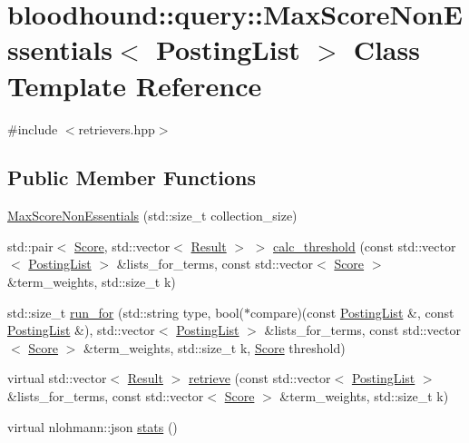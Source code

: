 \hypertarget{classbloodhound_1_1query_1_1MaxScoreNonEssentials}{}\section{bloodhound\+:\+:query\+:\+:Max\+Score\+Non\+Essentials$<$ Posting\+List $>$ Class Template Reference}
\label{classbloodhound_1_1query_1_1MaxScoreNonEssentials}


{\ttfamily \#include $<$retrievers.\+hpp$>$}

\subsection*{Public Member Functions}
\begin{DoxyCompactItemize}
\item 
\hyperlink{classbloodhound_1_1query_1_1MaxScoreNonEssentials_a4ca74b906a87120ffcad3bc6edcc148c}{Max\+Score\+Non\+Essentials} (std\+::size\+\_\+t collection\+\_\+size)
\item 
std\+::pair$<$ \hyperlink{structbloodhound_1_1Score}{Score}, std\+::vector$<$ \hyperlink{structbloodhound_1_1query_1_1Result}{Result} $>$ $>$ \hyperlink{classbloodhound_1_1query_1_1MaxScoreNonEssentials_a99253d51fb9d66cb6c4fd97e499ab1b0}{calc\+\_\+threshold} (const std\+::vector$<$ \hyperlink{classbloodhound_1_1PostingList}{Posting\+List} $>$ \&lists\+\_\+for\+\_\+terms, const std\+::vector$<$ \hyperlink{structbloodhound_1_1Score}{Score} $>$ \&term\+\_\+weights, std\+::size\+\_\+t k)
\item 
std\+::size\+\_\+t \hyperlink{classbloodhound_1_1query_1_1MaxScoreNonEssentials_a8ae12fdfe4bedefa5811bd89ffcf5597}{run\+\_\+for} (std\+::string type, bool($\ast$compare)(const \hyperlink{classbloodhound_1_1PostingList}{Posting\+List} \&, const \hyperlink{classbloodhound_1_1PostingList}{Posting\+List} \&), std\+::vector$<$ \hyperlink{classbloodhound_1_1PostingList}{Posting\+List} $>$ \&lists\+\_\+for\+\_\+terms, const std\+::vector$<$ \hyperlink{structbloodhound_1_1Score}{Score} $>$ \&term\+\_\+weights, std\+::size\+\_\+t k, \hyperlink{structbloodhound_1_1Score}{Score} threshold)
\item 
virtual std\+::vector$<$ \hyperlink{structbloodhound_1_1query_1_1Result}{Result} $>$ \hyperlink{classbloodhound_1_1query_1_1MaxScoreNonEssentials_a71c9050ca5961f061a659250932b42c2}{retrieve} (const std\+::vector$<$ \hyperlink{classbloodhound_1_1PostingList}{Posting\+List} $>$ \&lists\+\_\+for\+\_\+terms, const std\+::vector$<$ \hyperlink{structbloodhound_1_1Score}{Score} $>$ \&term\+\_\+weights, std\+::size\+\_\+t k)
\item 
virtual nlohmann\+::json \hyperlink{classbloodhound_1_1query_1_1MaxScoreNonEssentials_afb9b4ca76cca49d32ba584555d0b91fe}{stats} ()
\end{DoxyCompactItemize}
